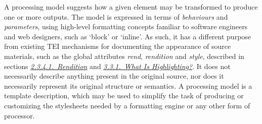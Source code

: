 A processing model suggests how a given element may be transformed to produce one or more outputs. The model is expressed in terms of \textit{behaviours} and \textit{parameters}, using high-level formatting concepts familiar to software engineers and web designers, such as ‘block’ or ‘inline’. As such, it has a different purpose from existing TEI mechanisms for documenting the appearance of source materials, such as the global attributes {\itshape rend}, {\itshape rendition} and {\itshape style}, described in sections \textit{\hyperref[HD57-1]{2.3.4.1.\ Rendition}} and \textit{\hyperref[COHQW]{3.3.1.\ What Is Highlighting?}}. It does not necessarily describe anything present in the original source, nor does it necessarily represent its original structure or semantics. A processing model is a template description, which may be used to simplify the task of producing or customizing the stylesheets needed by a formatting engine or any other form of processor.
